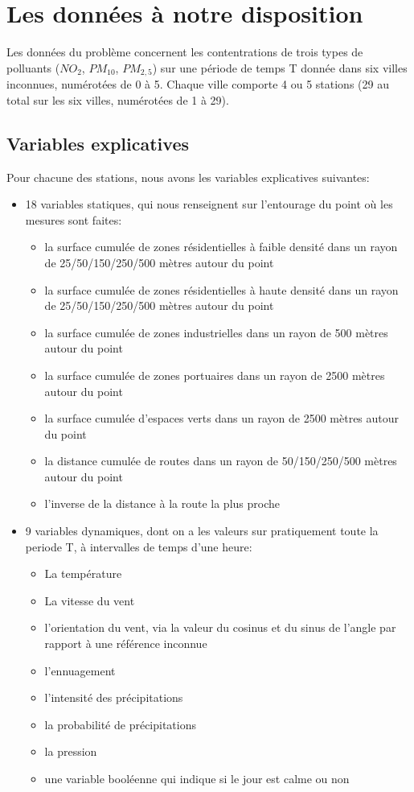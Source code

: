 \section{Les données à notre disposition}

Les données du problème concernent les contentrations de trois types de polluants ($NO_2$, $PM_{10}$, $PM_{2,5}$) sur une période de temps T donnée dans six villes inconnues, numérotées de 0 à 5.
Chaque ville comporte 4 ou 5 stations (29 au total sur les six villes, numérotées de 1 à 29).

\subsection{Variables explicatives}

Pour chacune des stations, nous avons les variables explicatives suivantes:
\begin{itemize}
  \item 18 variables statiques, qui nous renseignent sur l'entourage du point où les mesures sont faites:
  \begin{itemize}
    \item la surface cumulée de zones résidentielles à faible densité dans un rayon de 25/50/150/250/500 mètres autour du point
    \item la surface cumulée de zones résidentielles à haute densité dans un rayon de 25/50/150/250/500 mètres autour du point
    \item la surface cumulée de zones industrielles dans un rayon de 500 mètres autour du point
    \item la surface cumulée de zones portuaires dans un rayon de 2500 mètres autour du point
    \item la surface cumulée d'espaces verts dans un rayon de 2500 mètres autour du point
    \item la distance cumulée de routes dans un rayon de 50/150/250/500 mètres autour du point
    \item l'inverse de la distance à la route la plus proche
  \end{itemize}
  \item 9 variables dynamiques, dont on a les valeurs sur pratiquement toute la periode T, à intervalles de temps d'une heure:
  \begin{itemize}
    \item La température
    \item La vitesse du vent
    \item l'orientation du vent, via la valeur du cosinus et du sinus de l'angle par rapport à une référence inconnue
    \item l'ennuagement
    \item l'intensité des précipitations
    \item la probabilité de précipitations
    \item la pression
    \item une variable booléenne qui indique si le jour est calme ou non
  \end{itemize}
\end{itemize}

